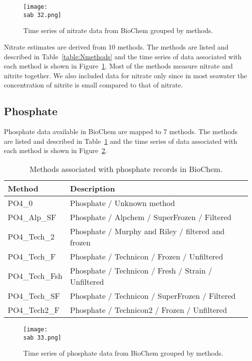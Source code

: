 \documentclass[letterpaper,portrait,11pt]{scrartcl}
\numberwithin{equation}{section}		%
\numberwithin{figure}{section}			%
\numberwithin{table}{section}				%
\newcommand{\ecomod}{\string~/ecomod_data/}   %
\newcommand{\sab}{\ecomod/mpa/sab/}   %
\begin{document}
\begin{appendices}
\begin{figure}[h]
  \label{fig:NTimeseries}
  \centering
  \texttt{[image: \\sab 32.png]}
  \caption{Time series of nitrate data from BioChem grouped by methods.}
\end{figure}

Nitrate estimates are derived from 10 methods. The methods are listed and described in Table~\ref{table:Nmethods} and the time series of data associated with each method is shown in Figure~\ref{fig:NTimeseries}. Most of the methods measure nitrate and nitrite together. We also included data for nitrate only since  in most seawater the concentration of nitrite is small compared to that of nitrate.

\clearpage
\subsection{Phosphate}

Phosphate  data available in BioChem are mapped to 7 methods. The methods are listed and described in Table~\ref{table:PhosphateMethods} and the time series of data associated with each method is shown in Figure~\ref{fig:PhosphateTimeseries}.

\begin{table}[h]
  \caption{Methods associated with phosphate records in BioChem.}
  \label{table:PhosphateMethods}
  \begin{tabular}{ll}
    Method & Description \\ \hline
    PO4\_0 & Phosphate / Unknown method  \\ 
    PO4\_Alp\_SF & Phosphate / Alpchem / SuperFrozen / Filtered \\ 
    PO4\_Tech\_2 & Phosphate / Murphy and Riley / filtered and frozen \\ 
    PO4\_Tech\_F & Phosphate / Technicon / Frozen / Unfiltered \\ 
    PO4\_Tech\_Fsh & Phosphate / Technicon / Fresh / Strain / Unfiltered \\
    PO4\_Tech\_SF & Phosphate / Technicon / SuperFrozen / Filtered \\
    PO4\_Tech2\_F & Phosphate / Technicon2 / Frozen / Unfiltered \\
  \end{tabular}
\end{table}


\begin{figure}[h]
  \centering
  \texttt{[image: \\sab 33.png]}
  \caption{Time series of phosphate data from BioChem grouped by methods.}
  \label{fig:PhosphateTimeseries}
\end{figure}



\end{appendices}
\end{document}
